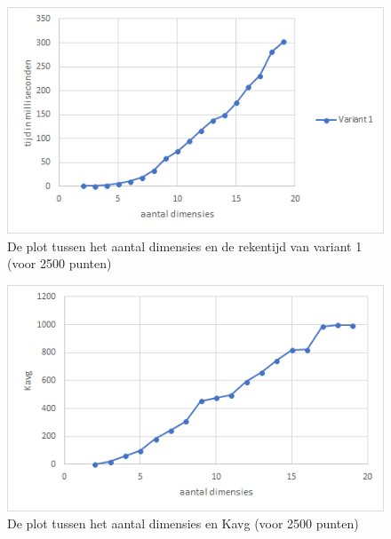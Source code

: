 \documentclass[12pt]{article}
\begin{document}
\begin{figure}
\includegraphics[width=\textwidth]{dim-var1-rekentijd.png}
\caption{De plot tussen het aantal dimensies en de rekentijd van variant 1 (voor 2500 punten)}
\end{figure}

\begin{figure}
\includegraphics[width=\textwidth]{dim-Kavg.png}
\caption{De plot tussen het aantal dimensies en Kavg (voor 2500 punten)}
\end{figure}
\end{document}

